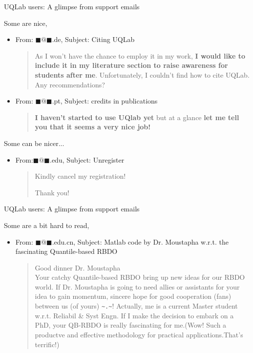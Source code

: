 \documentclass[]{rsuqbeamernew}
\begin{document}
\begin{frame}{UQLab users: A glimpse from support emails}

Some are nice,
\begin{itemize}
  \item From: $\blacksquare@\blacksquare$.de, Subject: Citing UQLab
  \begin{quotation}
    As I won't have the chance to employ it in my work, \textbf{I would like to include it in my literature section to raise awareness for students after me}.
    Unfortunately, I couldn't find how to cite UQLab. Any recommendations?
  \end{quotation}
  \item From: $\blacksquare@\blacksquare$.pt, Subject: credits in publications
  \begin{quotation}
    \textbf{I haven't started to use UQlab yet} but at a glance \textbf{let me tell you that it seems a very nice job!}
  \end{quotation}
\end{itemize}

Some can be nicer...
\begin{itemize}
  \item From:$\blacksquare@\blacksquare$.edu, Subject: Unregister
  \begin{quotation}
    Kindly cancel my registration!
    
    Thank you!
  \end{quotation}
\end{itemize}

\end{frame}

\begin{frame}{UQLab users: A glimpse from support emails}

Some are a bit hard to read,
\begin{itemize}
  \item From: $\blacksquare@\blacksquare$.edu.cn, Subject: Matlab code by Dr. Moustapha w.r.t. the fascinating Quantile-based RBDO
  \begin{quotation}
    Good dinner Dr. Moustapha \\
    Your catchy Quantile-based RBDO bring up new ideas for our RBDO world.
    If Dr. Moustapha is going to need allies or assistants for your idea to gain momentum, sincere hope for good cooperation (fans) between us (of yours) \texttt{\textasciitilde.\textasciitilde}!
    Actually, me is a current Master student w.r.t. Reliabil \& Syst Engn.
    If I make the decision to embark on a PhD, your QB-RBDO is really fascinating for me.(Wow! Such a productve and effective methodology for practical applications.That's terrific!)
  \end{quotation}
\end{itemize}

\end{frame}
\end{document}
